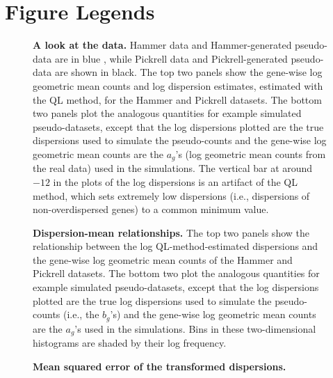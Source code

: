 \documentclass[10pt]{article}
\begin{document}


\section*{Figure Legends}


\begin{figure}[!ht]
   \centering
   \caption{{\bf A look at the data.} Hammer data and Hammer-generated pseudo-data are in blue 
   , while Pickrell data and Pickrell-generated pseudo-data are shown in black. 
    The top two panels show the gene-wise log geometric mean counts and log dispersion estimates, estimated with the QL method, for the Hammer and Pickrell datasets. The bottom two panels plot the analogous quantities for example simulated pseudo-datasets, except that the log dispersions plotted are the true dispersions used to simulate the pseudo-counts and the gene-wise log geometric mean counts are the $a_g$'s (log geometric mean counts from the real data) used in the simulations. The vertical bar at around $-12$ in the plots of the log dispersions is an artifact of the QL method, which sets  extremely low dispersions (i.e., dispersions of non-overdispersed genes) to a common minimum value.}
   \label{fig:hists}
\end{figure}

\begin{figure}[!ht]
   \centering
   \caption{{\bf Dispersion-mean relationships.} The top two panels show the relationship between the log QL-method-estimated dispersions and the gene-wise log geometric mean counts of the Hammer and Pickrell datasets. The bottom two plot the analogous quantities for example simulated pseudo-datasets, except that the log dispersions plotted are the true log dispersions used to simulate the pseudo-counts (i.e., the $b_g$'s) and the gene-wise log geometric mean counts are the $a_g$'s used in the simulations. Bins in these two-dimensional histograms are shaded by their log frequency.}
   \label{fig:meandispscatter}
\end{figure}

\begin{figure}[!ht] %
   \centering
   \caption{{\bf Mean squared error of the transformed dispersions.}}
   \label{fig:mse}
\end{figure}
\end{document}
